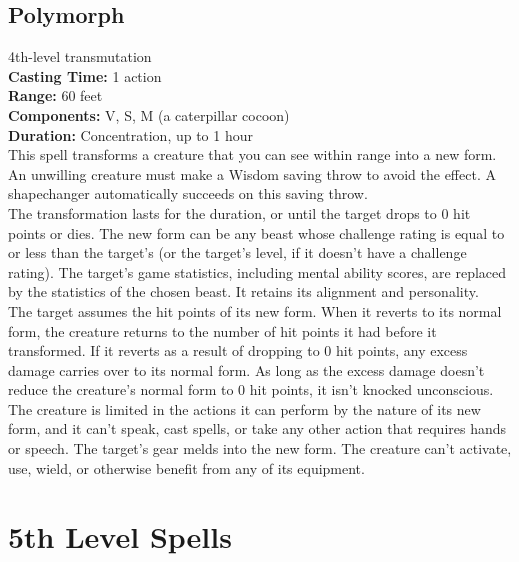 \documentclass[11pt, A4paper, english]{article}
\begin{document}
		\subsection{Polymorph}
4th-level transmutation \\
\textbf{Casting Time:} 1 action \\
\textbf{Range:} 60 feet \\
\textbf{Components:} V, S, M (a caterpillar cocoon) \\
\textbf{Duration:} Concentration, up to 1 hour \\
This spell transforms a creature that you can see within range into a new form. An unwilling creature must make a Wisdom saving throw to avoid the effect. A shapechanger automatically succeeds on this saving throw. \\
The transformation lasts for the duration, or until the target drops to 0 hit points or dies. The new form can be any beast whose challenge rating is equal to or less than the target’s (or the target's level, if it doesn't have a challenge rating). The target’s game statistics, including mental ability scores, are replaced by the statistics of the chosen beast. It retains its alignment and personality. \\
The target assumes the hit points of its new form. When it reverts to its normal form, the creature returns to the number of hit points it had before it transformed. If it reverts as a result of dropping to 0 hit points, any excess damage carries over to its normal form. As long as the excess damage doesn't reduce the creature’s normal form to 0 hit points, it isn't knocked unconscious. \\
The creature is limited in the actions it can perform by the nature of its new form, and it can't speak, cast spells, or take any other action that requires hands or speech. The target’s gear melds into the new form. The creature can’t activate, use, wield, or otherwise benefit from any of its equipment.



	\section{5th Level Spells}
\end{document}
